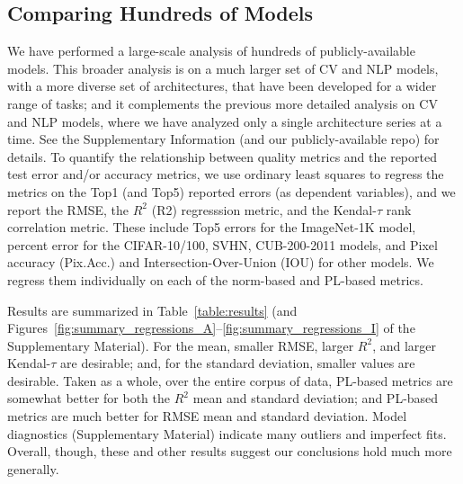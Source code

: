 \subsection{Comparing Hundreds of Models}
\label{sxn:all_cv_models}


We have performed a large-scale analysis of hundreds of publicly-available models.
This broader analysis is on a much larger set of CV and NLP models, with a more diverse set of architectures, that have been developed for a wider range of tasks; and it complements the previous more detailed analysis on CV and NLP models, where we have analyzed only a single architecture series at a time.
See the Supplementary Information
(and our publicly-available repo)
for details.
To quantify the relationship between quality metrics and the reported test error and/or accuracy metrics, we use ordinary least squares 
to regress the metrics on the Top1 (and Top5) reported errors (as dependent variables), and we report the RMSE, the $R^2$ (R2) regresssion metric, and the Kendal-$\tau$ rank correlation metric.
These include Top5 errors for the ImageNet-1K model, percent error for the CIFAR-10/100, SVHN, CUB-200-2011 models, and Pixel accuracy (Pix.Acc.) and Intersection-Over-Union (IOU) for other models.
We regress them individually on each of the norm-based and PL-based metrics.




Results are summarized in Table~\ref{table:results} (and Figures~\ref{fig:summary_regressions_A}--\ref{fig:summary_regressions_I} of the Supplementary Material).
For the mean, 
smaller RMSE, 
larger $R^2$, and 
larger Kendal-$\tau$ 
are desirable; 
and, for the standard deviation, smaller values are desirable.
Taken as a whole, over the entire corpus of data, PL-based metrics are somewhat better for both the $R^{2}$ mean and standard deviation;
and PL-based metrics are much better for RMSE mean and standard deviation.
Model diagnostics (Supplementary Material) indicate many outliers and imperfect fits.
Overall, though, these and other results suggest our conclusions hold much more generally.

